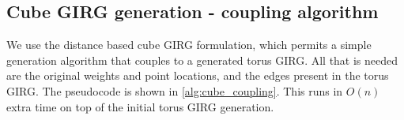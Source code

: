 

\subsection{Cube GIRG generation - coupling algorithm}
We use the distance based cube GIRG formulation, which permits a simple generation algorithm that couples to a generated torus GIRG. All that is needed are the original weights and point locations, and the edges present in the torus GIRG. The pseudocode is shown in \cref{alg:cube_coupling}. This runs in $O(n)$ extra time on top of the initial torus GIRG generation.

